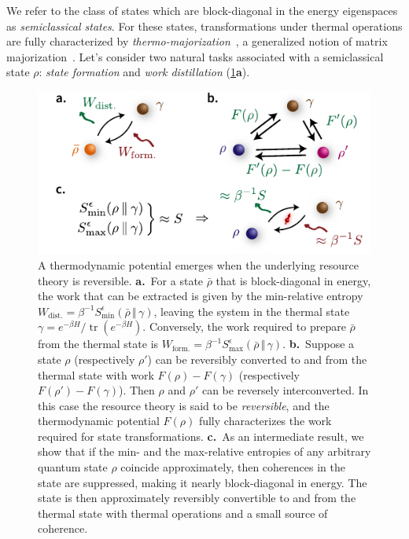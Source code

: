 \documentclass[prl,reprint,longbibliography,superscriptaddress]{revtex4-1}
\begin{document}
We refer to the class of states which are block-diagonal in the energy
eigenspaces as \emph{semiclassical states}.  For these states, transformations
under thermal operations are fully characterized by
\emph{thermo-majorization}~\cite{Horodecki2013_ThermoMaj}, a generalized notion
of matrix majorization~\cite{Ruch1978JCP,BookBhatiaMatrixAnalysis1997,BookMarshall2010Inequalities}.
Let's consider two natural tasks associated with a semiclassical state $\rho$:
\emph{state formation} and \emph{work distillation}
(\cref{fig:ReversibleInterConversionStates}\textbf{a}).
\begin{figure}
  \centering
  \includegraphics{fig-01.pdf}
  \caption{A thermodynamic potential emerges when the underlying resource theory
    is reversible.  \textbf{a.}~For a state $\bar\rho$ that is block-diagonal in
    energy, the work that can be extracted is given by the min-relative entropy
    $W_{\mathrm{dist.}} = \beta^{-1}{S}_{\mathrm{min}}^{\epsilon}(\bar\rho\,\Vert\,\gamma)$, leaving
    the system in the thermal state $\gamma={e}^{-\beta H}/\operatorname{tr}({e}^{-\beta H})$.
    Conversely, the work required to prepare $\bar\rho$ from the thermal state
    is $W_{\mathrm{form.}} = \beta^{-1}{S}_{\mathrm{max}}^{\epsilon}(\bar\rho\,\Vert\,\gamma)$.
    \textbf{b.}~Suppose a state $\rho$ (respectively $\rho'$) can be reversibly
    converted to and from the thermal state with work $F(\rho)-F(\gamma)$
    (respectively $F(\rho')-F(\gamma)$).  Then $\rho$ and $\rho'$ can be
    reversely interconverted.  In this case the resource theory is said to be
    \emph{reversible}, and the thermodynamic potential $F(\rho)$ fully
    characterizes the work required for state transformations.  \textbf{c.}~As
    an intermediate result, we show that if the min- and the max-relative
    entropies of any arbitrary quantum state $\rho$ coincide approximately, then
    coherences in the state are suppressed, making it nearly block-diagonal in
    energy.  The state is then approximately reversibly convertible to and from
    the thermal state with thermal operations and a small source of coherence.}
  \label{fig:ReversibleInterConversionStates}
\end{figure}
\end{document}
